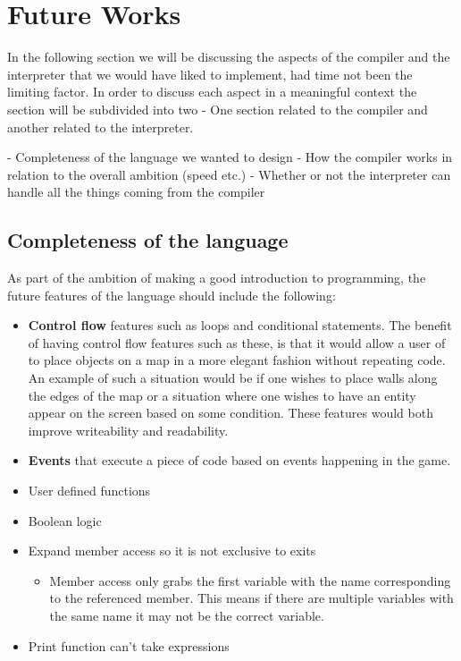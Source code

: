 \section{Future Works}

In the following section we will be discussing the aspects of the compiler and the interpreter that we would have liked to implement, had time not been the limiting factor. In order to discuss each aspect in a meaningful context the section will be subdivided into two - One section related to the compiler and another related to the interpreter.

- Completeness of the language we wanted to design
- How the compiler works in relation to the overall ambition (speed etc.)
- Whether or not the interpreter can handle all the things coming from the compiler

\subsection*{Completeness of the language}
As part of the ambition of making \dazel{} a good introduction to programming, the future features of the language should include the following: 

\begin{itemize}
    \item
      \textbf{Control flow} features such as loops and conditional statements. The benefit of having control flow features such as these, is that it would allow a user of \dazel{} to place objects on a map in a more elegant fashion without repeating code. An example of such a situation would be if one wishes to place walls along the edges of the map or a situation where one wishes to have an entity appear on the screen based on some condition. These features would both improve writeability and readability.
    \item
      \textbf{Events} that execute a piece of code based on events happening in the game.   
    \item
      User defined functions
    \item
      Boolean logic
    \item
      Expand member access so it is not exclusive to exits
      \begin{itemize}
      \item
        Member access only grabs the first variable with the name
        corresponding to the referenced member. This means if there are
        multiple variables with the same name it may not be the correct
        variable.
      \end{itemize}
    \item
      Print function can't take expressions
\end{itemize}

